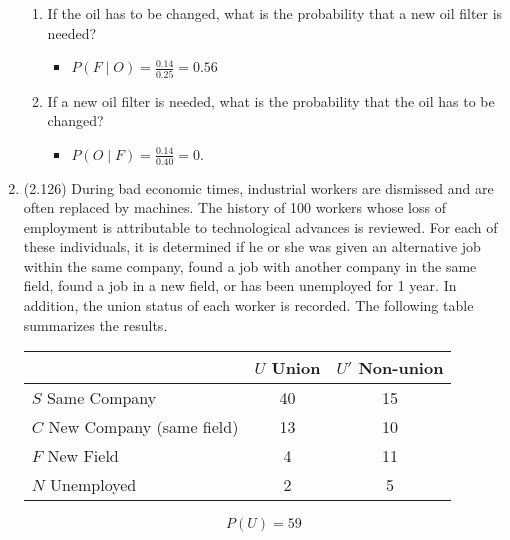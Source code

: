 \documentclass[basic, header]{nosvagor-notes} \usepackage{nosvagor-math}
\begin{document}
\begin{enumerate}[itemsep=8em]
\begin{enumerate}
      \item If the oil has to be changed, what is the probability that a new
        oil filter is needed?
        \begin{itemize}
          \item \(\displaystyle P(F \mid O) = \frac{0.14}{0.25} = 0.56 \)

        \end{itemize}

      \item If a new oil filter is needed, what is the probability that the
        oil has to be changed?
        \begin{itemize}
          \item \(\displaystyle P(O \mid F) = \frac{0.14}{0.40} = 0. \)

        \end{itemize}

    \end{enumerate}

    \vspace{-4em}
  \item (2.126) During bad economic times, industrial workers are
    dismissed and are often replaced by machines. The history of 100 workers
    whose loss of employment is attributable to technological advances is
    reviewed. For each of these individuals, it is determined if he or she was
    given an alternative job within the same company, found a job with another
    company in the same field, found a job in a new field, or has been
    unemployed for 1 year. In addition, the union status of each worker is
    recorded. The following table summarizes the results.
    \begin{table}[htpb]
      \centering
      \begin{tabular}{lcc}
        \toprule
                                  & \(U\) Union & \(U'\) Non-union \\
        \midrule
         \(S\) Same Company             &    40 & 15        \\
         \(C\) New Company (same field) &    13 & 10        \\
         \(F\) New Field                &     4 & 11        \\
         \(N\) Unemployed               &     2 & 5         \\
        \bottomrule
      \end{tabular}
    \end{table}
    \vspace{-1em}
      \[%
        P(U) = 59
      \]%
    \begin{enumerate}


\end{enumerate}
\end{enumerate}
\end{document}
